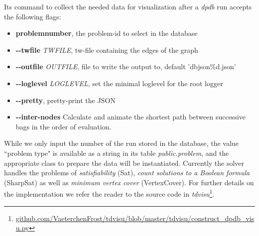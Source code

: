 \documentclass[a4paper, 12pt, bibliography=totoc]{scrartcl}
\begin{document}
Its command to collect the needed data for visualization after a \textit{dpdb} run accepts the following flags:
\begin{itemize}
	\item
	\textbf{problemnumber},
	 the problem-id to select in the database
	 
	\item
	\textbf{-{}-twfile }\textit{TWFILE},
	tw-file containing the edges of the graph 
	
	\item
	\textbf{-{}-outfile }\textit{OUTFILE},
	 file to write the output to, default 'dbjson\%d.json'
	 
	\item
	\textbf{-{}-loglevel }\textit{LOGLEVEL},
	 set the minimal loglevel for the root logger
	 
	\item
	\textbf{-{}-pretty},
	 pretty-print the JSON
	 
	\item
	\textbf{-{}-inter-nodes}
	Calculate and animate the shortest path between successive bags in the order of evaluation. 
\end{itemize}

While we only input the number of the run stored in the database, the value ``problem type" is available as a string in its table \emph{public.problem}, and the appropriate class to prepare the data will be instantiated. Currently the solver handles the problems of \textit{satisfiability} (Sat), \textit{count solutions to a Boolean formula} (SharpSat) as well as \textit{minimum vertex cover} (VertexCover).
For further details on the implementation we refer the reader to the source code in \textit{tdvisu}\footnote{\url{github.com/VaeterchenFrost/tdvisu/blob/master/tdvisu/construct_dpdb_visu.py}}.
\end{document}
